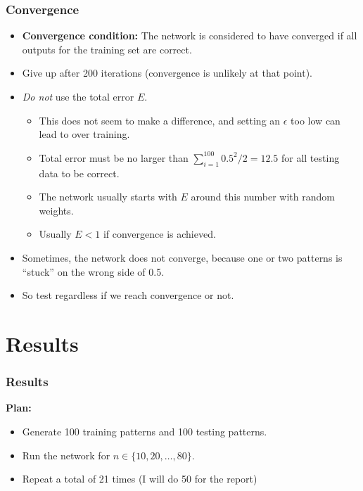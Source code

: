 \documentclass{beamer}
\numberwithin{equation}{section} %
\begin{document}
\begin{frame}
    \frametitle{Convergence}
    \begin{itemize}
        \item \textbf{Convergence condition: } The network is considered to have converged if all outputs for the training set are correct.
        \pause
        \item Give up after 200 iterations (convergence is unlikely at that point).
        \pause
        \item \textit{Do not} use the total error $E$.
        \pause
        \begin{itemize}
            \item This does not seem to make a difference, and setting an $\epsilon$ too low can lead to over training.
            \pause
            \item Total error must be no larger than $\sum_{i=1}^{100}{0.5^2}/2=12.5$ for all testing data to be correct.
            \pause
            \item The network usually starts with $E$ around this number with random weights.
            \pause
            \item Usually $E < 1$ if convergence is achieved.
        \end{itemize}
        \pause
        \item Sometimes, the network does not converge, because one or two patterns is ``stuck'' on the wrong side of 0.5.
        \pause
        \item So test regardless if we reach convergence or not.
    \end{itemize}
\end{frame}

\section{Results}

\begin{frame}
    \frametitle{Results}
    \textbf{Plan:}
    \begin{itemize}
        \item Generate 100 training patterns and 100 testing patterns.
        \pause
        \item Run the network for $n\in \{10, 20, \ldots, 80\}$.
        \pause
        \item Repeat a total of 21 times (I will do 50 for the report)
    \end{itemize}
\end{frame}
\end{document}
